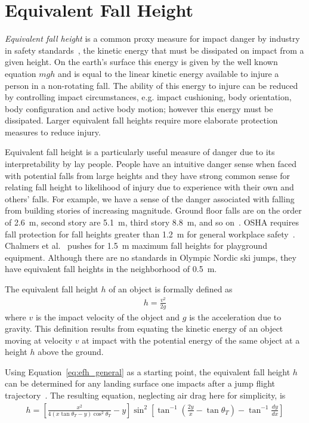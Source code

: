 \documentclass{article}
\begin{document}
\section{Equivalent Fall Height}
%
\emph{Equivalent fall height} is a common proxy measure for impact danger by
industry in safety standards~\cite{Hubbard2012}, the kinetic energy that must
be dissipated on impact from a given height. On the earth's surface this energy
is given by the well known equation $mgh$ and is equal to the linear kinetic
energy available to injure a person in a non-rotating fall. The ability of this
energy to injure can be reduced by controlling impact circumstances, e.g.
impact cushioning, body orientation, body configuration and active body motion;
however this energy must be dissipated. Larger equivalent fall heights require
more elaborate protection measures to reduce injury.

Equivalent fall height is a particularly useful measure of danger due to its
interpretability by lay people. People have an intuitive danger sense when
faced with potential falls from large heights and they have strong common sense
for relating fall height to likelihood of injury due to experience with their
own and others' falls. For example, we have a sense of the danger associated
with falling from building stories of increasing magnitude. Ground floor falls
are on the order of 2.6~\si{\meter}, second story are 5.1~\si{\meter}, third
story 8.8~\si{\meter}, and so on~\cite{Vish2005}. OSHA requires fall protection
for fall heights greater than 1.2~\si{\meter} for general workplace
safety~\cite{OSHA2021}. Chalmers et al.~\cite{Chalmers1996} pushes for 1.5~\si{\meter} maximum fall heights for playground equipment. Although there are no standards in Olympic Nordic ski jumps, they have equivalent fall heights in the neighborhood of 0.5~\si{\meter}.

The equivalent fall height $h$ of an object is formally defined as
%
\begin{align}
  h = \frac{v^2}{2g}
  \label{eq:efh_general}
\end{align}
%
where $v$ is the impact velocity of the object and $g$ is the acceleration due
to gravity. This definition results from equating the kinetic energy of an
object moving at velocity $v$ at impact with the potential energy of the same
object at a height $h$ above the ground.

Using Equation~\ref{eq:efh_general} as a starting point, the equivalent fall
height $h$ can be determined for any landing surface one impacts after a jump
flight trajectory~\cite{Hubbard2012}. The resulting equation, neglecting air
drag here for simplicity, is
%
\begin{align}
  h = \left[\frac{x^2}{4(x\tan\theta_T - y)\cos^{2}\theta_T} -
    y\right]\sin^{2}\left[\tan^{-1}\left(\frac{2y}{x}- \tan\theta_T\right) - \tan^{-1}\frac{dy}{dx}\right]
  \label{eq:efh}
\end{align}
\end{document}
